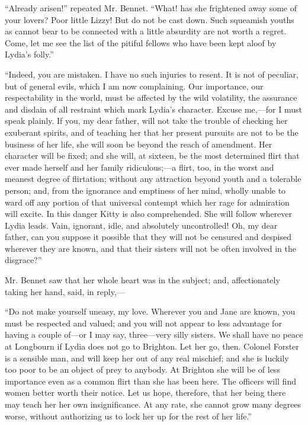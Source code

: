 \documentclass[12pt,openright]{book}
\begin{document}
“Already arisen!” repeated Mr. Bennet. “What! has she frightened away some of your lovers? Poor little Lizzy! But do not be cast down. Such squeamish youths as cannot bear to be connected with a little absurdity are not worth a regret. Come, let me see the list of the pitiful fellows who have been kept aloof by Lydia’s folly.”

“Indeed, you are mistaken. I have no such injuries to resent. It is not of peculiar, but of general evils, which I am now complaining. Our importance, our respectability in the world, must be affected by the wild volatility, the assurance and disdain of all restraint which mark Lydia’s character. Excuse me,—for I must speak plainly. If you, my dear father, will not take the trouble of checking her exuberant spirits, and of teaching her that her present pursuits are not to be the business of her life, she will soon be beyond the reach of amendment. Her character will be fixed; and she will, at sixteen, be the most determined flirt that ever made herself and her family ridiculous;—a flirt, too, in the worst and meanest degree of flirtation; without any attraction beyond youth and a tolerable person; and, from the ignorance and emptiness of her mind, wholly unable to ward off any portion of that universal contempt which her rage for admiration will excite. In this danger Kitty is also comprehended. She will follow wherever Lydia leads. Vain, ignorant, idle, and absolutely uncontrolled! Oh, my dear father, can you suppose it possible that they will not be censured and despised wherever they are known, and that their sisters will not be often involved in the disgrace?”

Mr. Bennet saw that her whole heart was in the subject; and, affectionately taking her hand, said, in reply,—

“Do not make yourself uneasy, my love. Wherever you and Jane are known, you must be respected and valued; and you will not appear to less advantage for having a couple of—or I may say, three—very silly sisters. We shall have no peace at Longbourn if Lydia does not go to Brighton. Let her go, then. Colonel Forster is a sensible man, and will keep her out of any real mischief; and she is luckily too poor to be an object of prey to anybody. At Brighton she will be of less importance even as a common flirt than she has been here. The officers will find women better worth their notice. Let us hope, therefore, that her being there may teach her her own insignificance. At any rate, she cannot grow many degrees worse, without authorizing us to lock her up for the rest of her life.”
\end{document}
